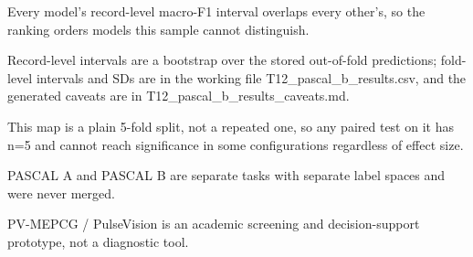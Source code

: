 \begin{table}[htbp]
  \par\footnotesize Every model's record-level macro-F1 interval overlaps every other's, so the ranking orders models this sample cannot distinguish.
  \par\footnotesize Record-level intervals are a bootstrap over the stored out-of-fold predictions; fold-level intervals and SDs are in the working file T12\_pascal\_b\_results.csv, and the generated caveats are in T12\_pascal\_b\_results\_caveats.md.
  \par\footnotesize This map is a plain 5-fold split, not a repeated one, so any paired test on it has n=5 and cannot reach significance in some configurations regardless of effect size.
  \par\footnotesize PASCAL A and PASCAL B are separate tasks with separate label spaces and were never merged.
  \par\footnotesize PV-MEPCG / PulseVision is an academic screening and decision-support prototype, not a diagnostic tool.
\end{table}
